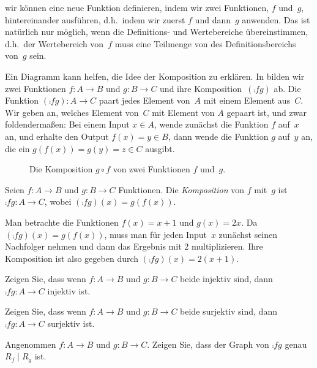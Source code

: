 \documentclass[../../../include/open-logic-section]{subfiles}
\begin{document}

\begin{explain}
wir können eine neue Funktion definieren, indem wir zwei Funktionen, $f$ und~$g$,
hintereinander ausführen, d.h.\ indem wir zuerst
$f$ und dann~$g$ anwenden. Das ist natürlich nur möglich, wenn die
Definitions- und Wertebereiche übereinstimmen, d.h.\ der Wertebereich von~$f$ muss eine Teilmenge von
des Definitionsbereichs von~$g$ sein. 

Ein Diagramm kann helfen, die Idee der Komposition zu erklären. In
 bilden wir zwei Funktionen $f \colon A \to B$
und $g \colon B \to C$ und ihre Komposition~$(\comp{f}{g})$ ab. Die
Funktion $(\comp{f}{g}) \colon A \to C$ paart jedes Element von~$A$
mit einem Element aus~$C$. Wir geben an, welches Element von~$C$
mit Element von $A$ gepaart ist, und zwar foldendermaßen: Bei einem Input $x \in
A$, wende zunächst die Funktion $f$ auf~$x$ an, und erhalte den Output $f(x)
= y \in B$, dann wende die Funktion $g$ auf~$y$ an, die ein
$g(f(x)) = g(y) = z \in C$ ausgibt.
\begin{figure}
  \caption{Die Komposition $g \circ f$ von zwei Funktionen $f$ und~$g$.}
\end{figure}
\end{explain}

\begin{defn}[Komposition]
Seien $f\colon A \to B$ und $g\colon B \to C$ Funktionen. Die
\emph{Komposition} von $f$ mit~$g$ ist $\comp{f}{g} \colon A \to C$,
wobei $(\comp{f}{g})(x) = g(f(x))$.
\end{defn}

\begin{ex}
Man betrachte die Funktionen $f(x) = x + 1$ und $g(x) = 2x$. Da
$(\comp{f}{g})(x) = g(f(x))$, muss man für jeden Input~$x$ zunächst 
seinen Nachfolger nehmen und dann das Ergebnis mit 2 multiplizieren. Ihre Komposition
ist also gegeben durch $(\comp{f}{g})(x) = 2(x+1)$.
\end{ex}

\begin{prob}
Zeigen Sie, dass wenn $f \colon A \to B$ und $g \colon B \to C$ beide
injektiv sind, dann $\comp{f}{g}\colon A \to C$ injektiv ist.
\end{prob}

\begin{prob}
Zeigen Sie, dass wenn $f \colon A \to B$ und $g \colon B \to C$ beide
surjektiv sind, dann $\comp{f}{g}\colon A \to C$ surjektiv ist.
\end{prob}

\begin{prob}
Angenommen $f \colon A \to B$ und $g \colon B \to C$. Zeigen Sie, dass der Graph
von $\comp{f}{g}$ genau $R_f \mid R_g$ ist.
\end{prob}
\end{document}
